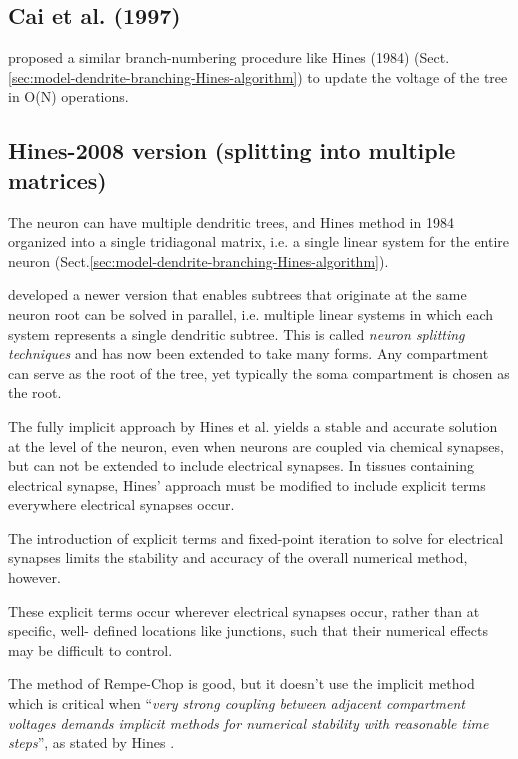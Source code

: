 \subsection{Cai et al. (1997)}

\citep{cai1997} proposed a similar branch-numbering procedure like Hines
(1984) (Sect.\ref{sec:model-dendrite-branching-Hines-algorithm}) to update the
voltage of the tree in O(N) operations.

\subsection{Hines-2008 version (splitting into multiple matrices)}

The neuron can have multiple dendritic trees, and Hines method in 1984 organized
into a single tridiagonal matrix, i.e. a single linear system for the entire
neuron (Sect.\ref{sec:model-dendrite-branching-Hines-algorithm}).

\citep{hines2008nsc} developed a newer version that enables subtrees that
originate at the same neuron root can be solved in parallel, i.e. multiple
linear systems in which each system represents a single dendritic subtree.
This is called {\it neuron splitting techniques} and has now been extended
to take many forms. Any  compartment  can  serve  as  the  root  of
the tree, yet typically the soma compartment is chosen as the root.

The fully implicit approach by Hines et al. yields a stable and accurate
solution at the level of the neuron, even when neurons are coupled via chemical
synapses, but can not be extended to include electrical synapses. In tissues
containing electrical synapse,  Hines' approach must be modified to include
explicit terms everywhere electrical synapses occur.

The introduction of explicit terms and fixed-point iteration to solve for
electrical synapses limits the stability and accuracy of the overall numerical
method, however.

These explicit terms occur wherever electrical synapses occur, rather than at
specific, well- defined locations like junctions, such that their numerical
effects may be difficult to control.

The method of Rempe-Chop is good, but it doesn't use the implicit method
which is critical when ``{\it very strong coupling between adjacent compartment
voltages demands implicit methods for numerical stability with reasonable time
steps}'', as stated by Hines \citep{hines2008fip}.

